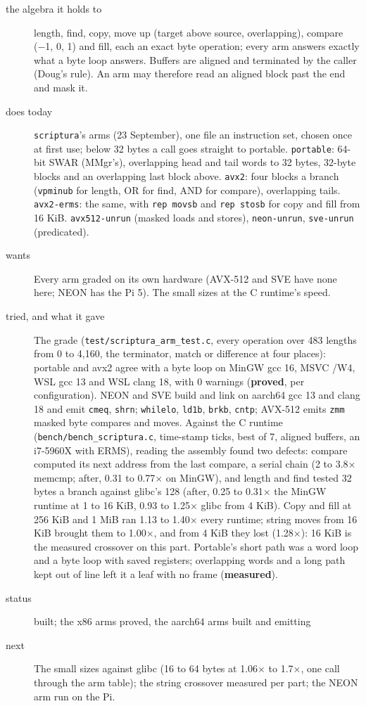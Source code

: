 \begin{description}
\item[{the algebra it holds to}] length, find, copy, move up (target above source, overlapping), compare (−1, 0, 1) and fill, each an exact byte operation; every arm answers exactly what a byte loop answers. Buffers are aligned and terminated by the caller (Doug's rule). An arm may therefore read an aligned block past the end and mask it.
\item[{does today}] \texttt{scriptura}'s arms (23 September), one file an instruction set, chosen once at first use; below 32 bytes a call goes straight to portable. \texttt{portable}: 64-bit SWAR (MMgr's), overlapping head and tail words to 32 bytes, 32-byte blocks and an overlapping last block above. \texttt{avx2}: four blocks a branch (\texttt{vpminub} for length, OR for find, AND for compare), overlapping tails. \texttt{avx2-\allowbreak{}erms}: the same, with \texttt{rep movsb} and \texttt{rep stosb} for copy and fill from 16 KiB. \texttt{avx512-\allowbreak{}unrun} (masked loads and stores), \texttt{neon-\allowbreak{}unrun}, \texttt{sve-\allowbreak{}unrun} (predicated).
\item[{wants}] Every arm graded on its own hardware (AVX-512 and SVE have none here; NEON has the Pi 5). The small sizes at the C runtime's speed.
\item[{tried, and what it gave}] The grade (\texttt{test/\allowbreak{}scriptura\_\allowbreak{}arm\_\allowbreak{}test.\allowbreak{}c}, every operation over 483 lengths from 0 to 4,160, the terminator, match or difference at four places): portable and avx2 agree with a byte loop on MinGW gcc 16, MSVC /W4, WSL gcc 13 and WSL clang 18, with 0 warnings (\textbf{proved}, per configuration). NEON and SVE build and link on aarch64 gcc 13 and clang 18 and emit \texttt{cmeq}, \texttt{shrn}; \texttt{whilelo}, \texttt{ld1b}, \texttt{brkb}, \texttt{cntp}; AVX-512 emits \texttt{zmm} masked byte compares and moves. Against the C runtime (\texttt{bench/\allowbreak{}bench\_\allowbreak{}scriptura.\allowbreak{}c}, time-stamp ticks, best of 7, aligned buffers, an i7-5960X with ERMS), reading the assembly found two defects: compare computed its next address from the last compare, a serial chain (2 to 3.8× memcmp; after, 0.31 to 0.77× on MinGW), and length and find tested 32 bytes a branch against glibc's 128 (after, 0.25 to 0.31× the MinGW runtime at 1 to 16 KiB, 0.93 to 1.25× glibc from 4 KiB). Copy and fill at 256 KiB and 1 MiB ran 1.13 to 1.40× every runtime; string moves from 16 KiB brought them to 1.00×, and from 4 KiB they lost (1.28×): 16 KiB is the measured crossover on this part. Portable's short path was a word loop and a byte loop with saved registers; overlapping words and a long path kept out of line left it a leaf with no frame (\textbf{measured}).
\item[{status}] built; the x86 arms proved, the aarch64 arms built and emitting
\item[{next}] The small sizes against glibc (16 to 64 bytes at 1.06× to 1.7×, one call through the arm table); the string crossover measured per part; the NEON arm run on the Pi.
\end{description}

